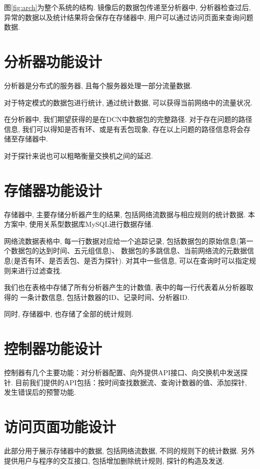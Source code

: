 图\ref{fig:arch}为整个系统的结构. 镜像后的数据包传递至分析器中, 分析器检查过后,
异常的数据以及统计结果将会保存在存储器中, 用户可以通过访问页面来查询问题数据.

\section{分析器功能设计}

  分析器是分布式的服务器, 且每个服务器处理一部分流量数据.

  对于特定模式的数据包进行统计, 通过统计数据, 可以获得当前网络中的流量状况.

  在分析器中, 我们期望获得的是在DCN中数据包的完整路径. 对于存在问题的路径信息,
我们可以得知是否有环、或是有丢包现象, 存在以上问题的路径信息将会存储至存储器中.

  对于探针来说也可以粗略衡量交换机之间的延迟.

\section{存储器功能设计}

存储器中, 主要存储分析器产生的结果, 包括网络流数据与相应规则的统计数据.
本方案中, 使用关系型数据库MySQL\cite{mysql}进行数据存储.

网络流数据表格中, 每一行数据对应给一个追踪记录,
包括数据包的原始信息(第一个数据包的达到时间、五元组信息)、
数据包的多跳信息、当前网络流的元数据信息(是否有环、是否丢包、是否为探针).
对其中一些信息, 可以在查询时可以指定规则来进行过滤查找.

我们也在表格中存储了所有分析器产生的计数值, 表中的每一行代表着从分析器取得的
一条计数信息, 包括计数器的ID、记录时间、分析器ID.

同时, 存储器中, 也存储了全部的统计规则.

\section{控制器功能设计}

控制器有几个主要功能：对分析器配置、向外提供API接口、向交换机中发送探针.
目前我们提供的API包括：按时间查找数据流、查询计数器的值、添加探针,
发生错误后的预警功能.

\section{访问页面功能设计}

此部分用于展示存储器中的数据, 包括网络流数据, 不同的规则下的统计数据.
另外提供用户与程序的交互接口, 包括增加删除统计规则, 探针的构造及发送.

